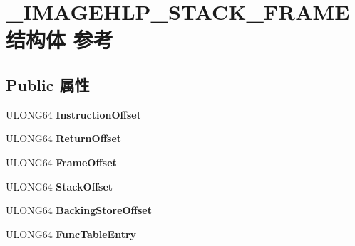 \hypertarget{struct___i_m_a_g_e_h_l_p___s_t_a_c_k___f_r_a_m_e}{}\section{\+\_\+\+I\+M\+A\+G\+E\+H\+L\+P\+\_\+\+S\+T\+A\+C\+K\+\_\+\+F\+R\+A\+M\+E结构体 参考}
\label{struct___i_m_a_g_e_h_l_p___s_t_a_c_k___f_r_a_m_e}
\subsection*{Public 属性}
\begin{DoxyCompactItemize}
\item 
\mbox{\label{struct___i_m_a_g_e_h_l_p___s_t_a_c_k___f_r_a_m_e_a0af0d70bd9685fa79793dfc57fa975ab}} 
U\+L\+O\+N\+G64 {\bfseries Instruction\+Offset}
\item 
\mbox{\label{struct___i_m_a_g_e_h_l_p___s_t_a_c_k___f_r_a_m_e_a6f5fef9de3e21317c9c9a954897494e2}} 
U\+L\+O\+N\+G64 {\bfseries Return\+Offset}
\item 
\mbox{\label{struct___i_m_a_g_e_h_l_p___s_t_a_c_k___f_r_a_m_e_abfb5ad385d383fac5880848e2bb99df8}} 
U\+L\+O\+N\+G64 {\bfseries Frame\+Offset}
\item 
\mbox{\label{struct___i_m_a_g_e_h_l_p___s_t_a_c_k___f_r_a_m_e_a59bfc8dd3d747c6989ffb58d0d26b14f}} 
U\+L\+O\+N\+G64 {\bfseries Stack\+Offset}
\item 
\mbox{\label{struct___i_m_a_g_e_h_l_p___s_t_a_c_k___f_r_a_m_e_a0a7a6f32bd4649c2024b49bc054597a2}} 
U\+L\+O\+N\+G64 {\bfseries Backing\+Store\+Offset}
\item 
\mbox{\label{struct___i_m_a_g_e_h_l_p___s_t_a_c_k___f_r_a_m_e_a42316163e0b24708f1a07280a1236ec0}} 
U\+L\+O\+N\+G64 {\bfseries Func\+Table\+Entry}
\item 
\mbox{\label{struct___i_m_a_g_e_h_l_p___s_t_a_c_k___f_r_a_m_e_a60968a51948ca6f69cbced09eee798c0}} 

\end{DoxyCompactItemize}
